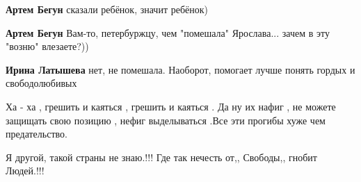 \begin{itemize}
\begin{itemize}
 
\textbf{Артем Бегун} сказали ребёнок, значит ребёнок)

 
\textbf{Артем Бегун} Вам-то, петербуржцу, чем "помешала" Ярослава... зачем в эту "возню" влезаете?))

 
\textbf{Ирина Латышева} нет, не помешала. Наоборот, помогает лучше понять гордых и свободолюбивых
\end{itemize}

 

Ха - ха , грешить и каяться , грешить и каяться . Да ну их нафиг , не можете
защищать свою позицию , нефиг выделываться .Все эти прогибы хуже чем
предательство.


 

Я другой, такой страны не знаю.!!! Где так нечесть от,, Свободы,, гнобит
Людей.!!!

\begin{itemize}
 

\end{itemize}
\end{itemize}
